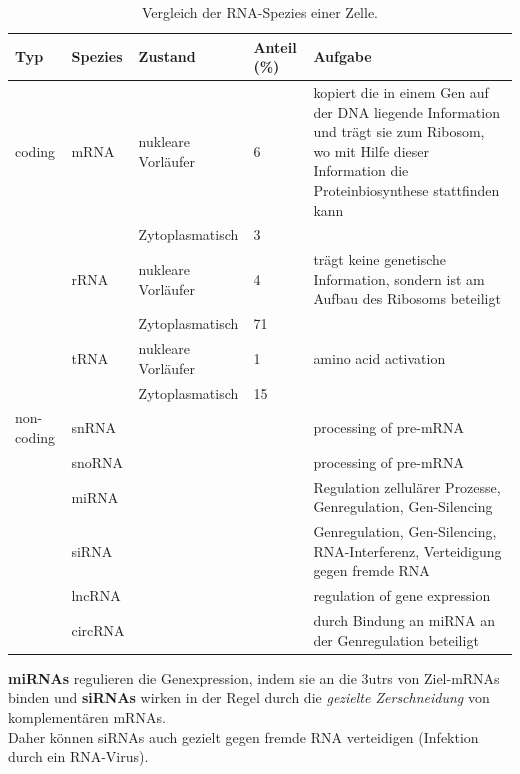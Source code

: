 \begin{table}[H] %
    \centering
    \begin{tabular}{|p{2cm}p{2cm}p{3cm}p{1cm}p{6cm}|} \hline
       \textbf{Typ} &  \textbf{Spezies} & \textbf{Zustand} & \textbf{Anteil (\%)}  & \textbf{Aufgabe} \\ \hline \hline 
        coding &  mRNA & nukleare Vorläufer & 6  &  kopiert die in einem Gen auf der DNA liegende Information und trägt sie zum Ribosom, wo mit Hilfe dieser Information die Proteinbiosynthese stattfinden kann \\
        & & Zytoplasmatisch & 3 & \\ \hline
      &   rRNA & nukleare Vorläufer & 4 & trägt keine genetische Information, sondern ist am Aufbau des Ribosoms beteiligt \\
       & & Zytoplasmatisch & 71 & \\  \hline
       &  tRNA & nukleare Vorläufer & 1  & amino acid activation \\
       & & Zytoplasmatisch & 15 & \\ \hline \hline
      non-coding & snRNA & &  & processing of pre-mRNA \\
      & snoRNA & & & processing of pre-mRNA \\
      & miRNA & & & Regulation zellulärer Prozesse, Genregulation,  \gls{Gen-Silencing}  \\
      & siRNA & & & Genregulation, \gls{Gen-Silencing}, \gls{RNA-Interferenz}, Verteidigung gegen fremde RNA   \\
      & lncRNA & & & regulation of gene expression \\
      & circRNA &  & & durch Bindung an miRNA an der Genregulation beteiligt \\ \hline 
    \end{tabular}
    \caption{Vergleich der RNA-Spezies einer Zelle.}
    \label{tab:rnaspezies}
\end{table}    
   
\begin{mechanism}[title=Unterschied zwischen miRNA und siRNA]
 \textbf{miRNAs} regulieren die Genexpression, indem sie an die \glspl{3utr} von Ziel-mRNAs binden und \textbf{siRNAs} wirken in der Regel durch die \textit{gezielte Zerschneidung} von komplementären mRNAs.  \\
 Daher können siRNAs auch gezielt gegen fremde RNA verteidigen (Infektion durch ein \gls{RNA-Virus}).  
\end{mechanism}

